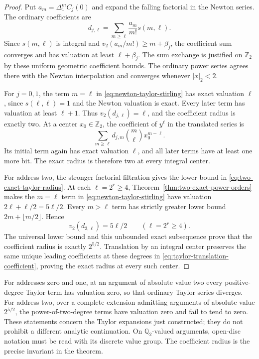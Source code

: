 \begin{proof}
Put $a_m=\Delta_1^mC_j(0)$ and expand the falling factorial in the
Newton series. The ordinary coefficients are
\begin{equation}
 d_{j,\ell}=\sum_{m\geq\ell}\frac{a_m}{m!}s(m,\ell).
 \label{eq:newton-taylor-stirling}
\end{equation}
Since $s(m,\ell)$ is integral and
$v_2(a_m/m!)\geq m+\beta_j$, the coefficient sum converges and has
valuation at least $\ell+\beta_j$. The sum exchange is justified on
$\mathbb Z_2$ by these uniform geometric coefficient bounds.
The ordinary power series agrees there with the Newton interpolation
and converges whenever $|x|_2<2$.

For $j=0,1$, the term $m=\ell$ in
\eqref{eq:newton-taylor-stirling} has exact valuation $\ell$, since
$s(\ell,\ell)=1$ and the Newton valuation is exact. Every later term
has valuation at least $\ell+1$. Thus
$v_2(d_{j,\ell})=\ell$, and the coefficient radius is exactly two.
At a center $x_0\in\mathbb Z_2$, the coefficient of $y^\ell$ in the
translated series is
\begin{equation}
 \sum_{m\geq\ell}d_{j,m}\binom m\ell x_0^{m-\ell}.
 \label{eq:taylor-translation-coefficient}
\end{equation}
Its initial term again has exact valuation $\ell$, and all later
terms have at least one more bit. The exact radius is therefore two
at every integral center.

For address two, the stronger factorial filtration gives the lower
bound in \eqref{eq:two-exact-taylor-radius}. At each
$\ell=2^r\geq4$, Theorem~\ref{thm:two-exact-power-orders} makes the
$m=\ell$ term in \eqref{eq:newton-taylor-stirling} have valuation
$2\ell+\ell/2=5\ell/2$. Every $m>\ell$ term has strictly greater
lower bound $2m+\lfloor m/2\rfloor$. Hence
\[
 v_2(d_{2,\ell})=5\ell/2\qquad(\ell=2^r\geq4).
\]
The universal lower bound and this unbounded exact subsequence prove
that the coefficient radius is exactly $2^{5/2}$. Translation by an
integral center preserves the same unique leading coefficients at
these degrees in \eqref{eq:taylor-translation-coefficient}, proving
the exact radius at every such center.
\end{proof}

\begin{remark}
For addresses zero and one, at an argument of absolute value two every
positive-degree Taylor term has valuation zero, so that ordinary Taylor
series diverges. For address two, over a complete extension admitting
arguments of absolute value $2^{5/2}$, the power-of-two-degree terms
have valuation zero and fail to tend to zero. These statements concern
the Taylor expansions just constructed; they do not prohibit a
different analytic continuation. On $\mathbb Q_2$-valued arguments,
open-disc notation must be read with its discrete value group. The
coefficient radius is the precise invariant in the theorem.
\end{remark}

